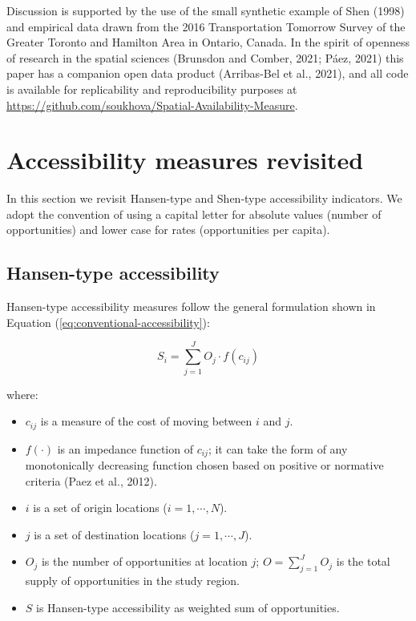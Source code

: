 \documentclass[]{elsarticle} %
\providecommand{\tightlist}{%
  \setlength{\itemsep}{0pt}\setlength{\parskip}{0pt}}
\begin{document}
Discussion is supported by the use of the small synthetic example of
Shen (1998) and empirical data drawn from the 2016 Transportation
Tomorrow Survey of the Greater Toronto and Hamilton Area in Ontario,
Canada. In the spirit of openness of research in the spatial sciences
(Brunsdon and Comber, 2021; Páez, 2021) this paper has a companion open
data product (Arribas-Bel et al., 2021), and all code is available for
replicability and reproducibility purposes at
\url{https://github.com/soukhova/Spatial-Availability-Measure}.

\hypertarget{background}{%
\section{Accessibility measures revisited}\label{background}}

In this section we revisit Hansen-type and Shen-type accessibility
indicators. We adopt the convention of using a capital letter for
absolute values (number of opportunities) and lower case for rates
(opportunities per capita).

\hypertarget{hansen-type-accessibility}{%
\subsection{Hansen-type accessibility}\label{hansen-type-accessibility}}

Hansen-type accessibility measures follow the general formulation shown
in Equation (\ref{eq:conventional-accessibility}):

\begin{equation}
\label{eq:conventional-accessibility}
S_i = \sum_{j=1}^JO_j \cdot f(c_{ij})
\end{equation}

\noindent where:

\begin{itemize}
\tightlist
\item
  \(c_{ij}\) is a measure of the cost of moving between \(i\) and \(j\).
\item
  \(f(\cdot)\) is an impedance function of \(c_{ij}\); it can take the
  form of any monotonically decreasing function chosen based on positive
  or normative criteria (Paez et al., 2012).
\item
  \(i\) is a set of origin locations (\(i = 1,\cdots,N\)).
\item
  \(j\) is a set of destination locations (\(j = 1,\cdots,J\)).
\item
  \(O_j\) is the number of opportunities at location \(j\);
  \(O = \sum_{j=1}^J O_j\) is the total supply of opportunities in the
  study region.
\item
  \(S\) is Hansen-type accessibility as weighted sum of opportunities.
\end{itemize}
\end{document}
